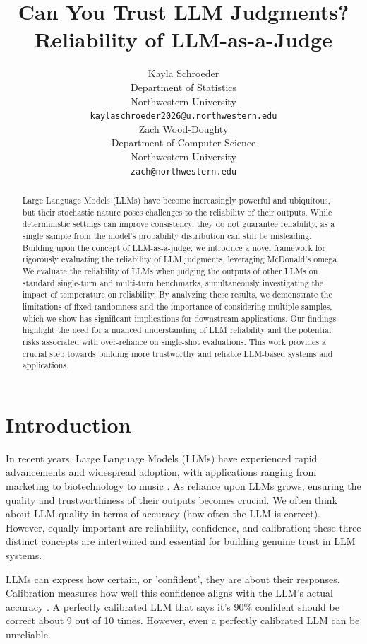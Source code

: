 \documentclass[11pt]{article}
\title{Can You Trust LLM Judgments? Reliability of LLM-as-a-Judge}
\author{Kayla Schroeder \\
  Department of Statistics \\
  Northwestern University \\
  \texttt{kaylaschroeder2026@u.northwestern.edu} \\\And
  Zach Wood-Doughty \\
  Department of Computer Science \\
  Northwestern University \\
  \texttt{zach@northwestern.edu} \\}
\begin{document}
\maketitle
\begin{abstract}

Large Language Models (LLMs) have become increasingly powerful and ubiquitous, but their stochastic nature poses challenges to the reliability of their outputs. While deterministic settings can improve consistency, they do not guarantee reliability, as a single sample from the model's probability distribution can still be misleading. Building upon the concept of LLM-as-a-judge, we introduce a novel framework for rigorously evaluating the reliability of LLM judgments, leveraging McDonald's omega. We evaluate the reliability of LLMs when judging the outputs of other LLMs on standard single-turn and multi-turn benchmarks, simultaneously investigating the impact of temperature on reliability. By analyzing these results, we demonstrate the limitations of fixed randomness and the importance of considering multiple samples, which we show has significant implications for downstream applications. Our findings highlight the need for a nuanced understanding of LLM reliability and the potential risks associated with over-reliance on single-shot evaluations. This work provides a crucial step towards building more trustworthy and reliable LLM-based systems and applications.



\end{abstract}


\section{Introduction}
\label{sec:intro}

In recent years, Large Language Models (LLMs) have experienced rapid advancements and widespread adoption, with applications ranging from marketing to biotechnology to music \citep{gozalo2023survey}. As reliance upon LLMs grows, ensuring the quality and trustworthiness of their outputs becomes crucial. We often think about LLM quality in terms of accuracy (how often the LLM is correct). However, equally important are reliability, confidence, and calibration; these three distinct concepts are intertwined and essential for building genuine trust in LLM systems. 


LLMs can express how certain, or 'confident', they are about their responses. Calibration measures how well this confidence aligns with the LLM's actual accuracy \citep{kotelanski2023methods, spiess2024calibration}. A perfectly calibrated LLM that says it's 90\% confident should be correct about 9 out of 10 times. However, even a perfectly calibrated LLM can be unreliable.
\end{document}
